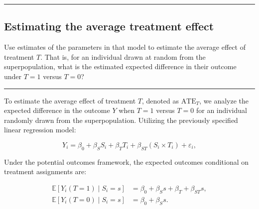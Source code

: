 \documentclass{article}
\newenvironment{colorparagraph}[1]{\par\color{#1}}{\par}
\begin{document}

\begin{colorparagraph}{questioncolor}
\rule{\textwidth}{0.5pt}

\label{q3c}\subsection{Estimating the average treatment effect}
Use estimates of the parameters in that model to estimate the average effect of treatment \(T\). That is, for an individual drawn at random from the superpopulation, what is the estimated expected difference in their outcome under \(T = 1\) versus \(T = 0\)?

\rule{\textwidth}{0.5pt}
\end{colorparagraph}

To estimate the average effect of treatment \(T\), denoted as \(\text{ATE}_T\), we analyze the expected difference in the outcome \(Y\) when \(T = 1\) versus \(T = 0\) for an individual randomly drawn from the superpopulation. Utilizing the previously specified linear regression model:

\[
Y_i = \beta_0 + \beta_S S_i + \beta_T T_i + \beta_{ST} (S_i \times T_i) + \varepsilon_i,
\]

Under the potential outcomes framework, the expected outcomes conditional on treatment assignments are:

\[
\begin{aligned}
\mathbb{E}[Y_i(T=1) \mid S_i = s] &= \beta_0 + \beta_S s + \beta_T + \beta_{ST} s, \\
\mathbb{E}[Y_i(T=0) \mid S_i = s] &= \beta_0 + \beta_S s.
\end{aligned}
\]
\end{document}
